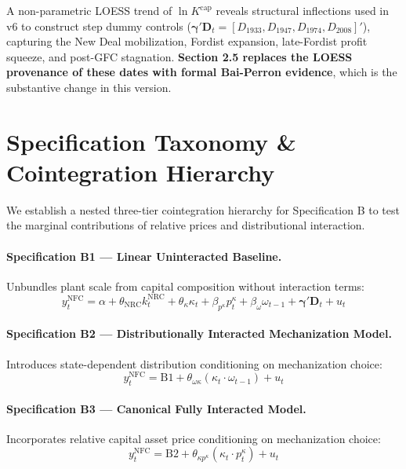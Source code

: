 \documentclass[11pt,a4paper]{article}
\begin{document}
A non-parametric LOESS trend of $\ln K^{\text{cap}}$ reveals structural inflections used in v6 to construct step dummy controls ($\boldsymbol{\gamma}' \mathbf{D}_t = [D_{1933}, D_{1947}, D_{1974}, D_{2008}]'$), capturing the New Deal mobilization, Fordist expansion, late-Fordist profit squeeze, and post-GFC stagnation. \textbf{Section 2.5 replaces the LOESS provenance of these dates with formal Bai-Perron evidence}, which is the substantive change in this version.

\FloatBarrier
\section{Specification Taxonomy \& Cointegration Hierarchy}

We establish a nested three-tier cointegration hierarchy for Specification B to test the marginal contributions of relative prices and distributional interaction.

\paragraph{Specification B1 --- Linear Uninteracted Baseline.} Unbundles plant scale from capital composition without interaction terms:
\begin{equation}
y_t^{\text{NFC}} = \alpha + \theta_{\text{NRC}} k_t^{\text{NRC}} + \theta_{\kappa} \kappa_t + \beta_{p^{\kappa}} p_t^{\kappa} + \beta_{\omega} \omega_{t-1} + \boldsymbol{\gamma}' \mathbf{D}_t + u_t
\end{equation}

\paragraph{Specification B2 --- Distributionally Interacted Mechanization Model.} Introduces state-dependent distribution conditioning on mechanization choice:
\begin{equation}
y_t^{\text{NFC}} = \text{B1} + \theta_{\omega \kappa} (\kappa_t \cdot \omega_{t-1}) + u_t
\end{equation}

\paragraph{Specification B3 --- Canonical Fully Interacted Model.} Incorporates relative capital asset price conditioning on mechanization choice:
\begin{equation}
y_t^{\text{NFC}} = \text{B2} + \theta_{\kappa p^{\kappa}} (\kappa_t \cdot p_t^{\kappa}) + u_t
\end{equation}
\end{document}
